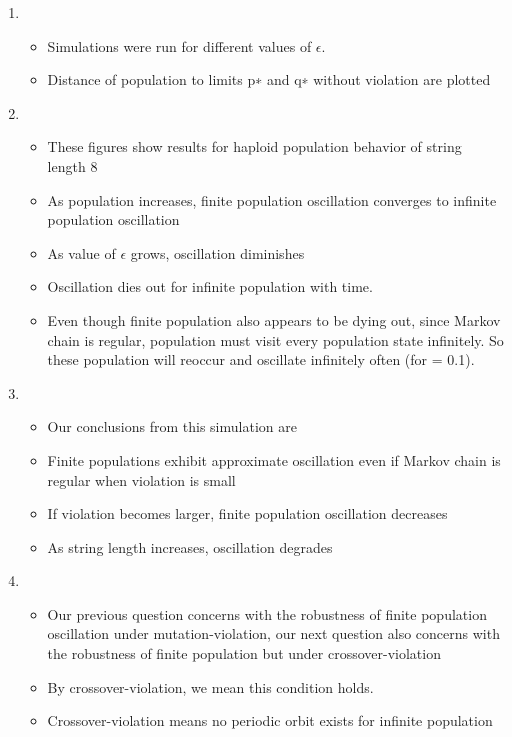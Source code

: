 \documentclass{article}
\begin{document}
\begin{enumerate}
\item
  \begin{itemize}
  \item Simulations were run for different values of $\epsilon$.
  \item Distance of population to limits p∗ and q∗ without violation are plotted  
  \end{itemize}
  
\item
  \begin{itemize}
  \item These figures show results for haploid population behavior of string length 8
  \item As population increases, finite population oscillation converges to infinite population oscillation
  \item As value of $\epsilon$ grows, oscillation diminishes
  \item Oscillation dies out for infinite population with time.
  \item Even though finite population also appears to be dying out, since Markov chain is regular, population must visit every population state infinitely. 
  So these population will reoccur and oscillate infinitely often (for = 0.1).  
  \end{itemize}
  
  
\item
  \begin{itemize}
  \item Our conclusions from this simulation are
  \item Finite populations exhibit approximate oscillation even if Markov chain is regular when violation is small
  \item If violation becomes larger, finite population oscillation decreases
  \item As string length increases, oscillation degrades
  \end{itemize}
  
\item
  \begin{itemize}
  \item Our previous question concerns with the robustness of finite population oscillation under mutation-violation, 
  our next question also concerns with the robustness of finite population but under crossover-violation 
  \item By crossover-violation, we mean this condition holds.
  \item Crossover-violation means no periodic orbit exists for infinite population
  \end{itemize}


\end{enumerate}
\end{document}
